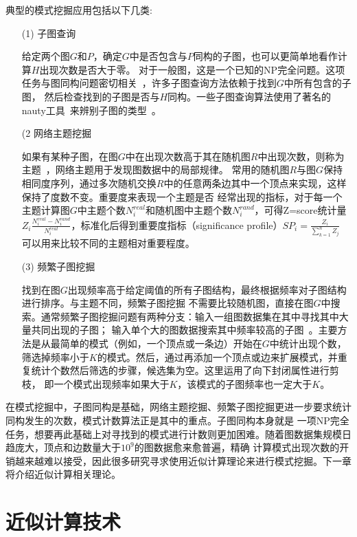 \documentclass[master]{thesis-uestc}
\begin{document}
    典型的模式挖掘应用包括以下几类:
\begin{enumerate}
    \item[(1)] 子图查询
    
    给定两个图$G$和$P$，确定$G$中是否包含与$P$同构的子图，也可以更简单地看作计算$H$出现次数是否大于零。
对于一般图，这是一个已知的NP完全问题。这项任务与图同构问题密切相关~\cite{Isomorphism}，许多子图查询方法依赖于找到$G$中所有包含的子图，
然后检查找到的子图是否与$H$同构。一些子图查询算法使用了著名的nauty工具~\cite{Nauty}来辨别子图的类型~\cite{Towards,GTries,FANMOD}。

    \item[(2] 网络主题挖掘
        
    如果有某种子图，在图$G$中在出现次数高于其在随机图$R$中出现次数，则称为主题~\cite{Motifs}，网络主题用于发现图数据中的局部规律。
常用的随机图$R$与图$G$保持相同度序列，通过多次随机交换$R$中的任意两条边其中一个顶点来实现，这样保持了度数不变。重要度来表现一个主题是否
经常出现的指标，对于每一个主题计算图$G$中主题个数$N_i^{real}$和随机图中主题个数$N_i^{rand}$，可得Z=score统计量
$Z_i\frac{N_i^{real}-N_i^{rand}}{N_i^{real}}$，标准化后得到重要度指标（significance profile）$SP_i=\frac{Z_i}{\sum_{k=1}^{n}Z_j}$
可以用来比较不同的主题相对重要程度。

    \item[(3)] 频繁子图挖掘

    找到在图$G$出现频率高于给定阈值的所有子图结构，最终根据频率对子图结构进行排序。与主题不同，频繁子图挖掘
不需要比较随机图，直接在图$G$中搜索。通常频繁子图挖掘问题有两种分支：输入一组图数据集在其中寻找其中大量共同出现的子图；
输入单个大的图数据搜索其中频率较高的子图~\cite{SurveyFSM}。主要方法是从最简单的模式（例如，一个顶点或一条边）开始在$G$中统计出现个数，
筛选掉频率小于$K$的模式。然后，通过再添加一个顶点或边来扩展模式，并重复统计个数然后筛选的步骤，候选集为空。这里运用了向下封闭属性进行剪枝，
即一个模式出现频率如果大于$K$，该模式的子图频率也一定大于$K$。

\end{enumerate}

    在模式挖掘中，子图同构是基础，网络主题挖掘、频繁子图挖掘更进一步要求统计同构发生的次数，模式计数算法正是其中的重点。子图同构本身就是
一项NP完全任务，想要再此基础上对寻找到的模式进行计数则更加困难。随着图数据集规模日趋庞大，顶点和边数量大于$10^9$的图数据愈来愈普遍，精确
计算模式出现次数的开销越来越难以接受，因此很多研究寻求使用近似计算理论来进行模式挖掘。下一章将介绍近似计算相关理论。

\section{近似计算技术}
\label{sec:approximate}
    
\end{document}
